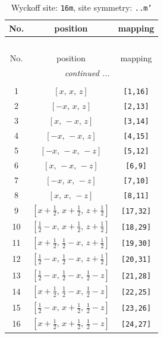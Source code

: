 \documentclass[fleqn,8pt]{jsarticle}
\begin{document}
\renewcommand{\arraystretch}{1.2}
\begin{longtable}{ccc}
\caption{Wyckoff site: {\tt 16m}, site symmetry: {\tt ..m'}}
 \\
 \hline \hline
No. & position & mapping \\ \hline \endfirsthead

\multicolumn{2}{l}{\tablename\ \thetable{}} \\
 \hline \hline
No. & position & mapping \\ \hline \endhead

 \hline \hline
\multicolumn{2}{r}{\footnotesize\it continued ...} \\ \endfoot

 \hline \hline
\multicolumn{2}{r}{} \\ \endlastfoot

1 & $\left[ x,\, x,\, z \right]$ & {\tt [1,16]} \\ \hline
2 & $\left[ - x,\, x,\, z \right]$ & {\tt [2,13]} \\ \hline
3 & $\left[ x,\, - x,\, z \right]$ & {\tt [3,14]} \\ \hline
4 & $\left[ - x,\, - x,\, z \right]$ & {\tt [4,15]} \\ \hline
5 & $\left[ - x,\, - x,\, - z \right]$ & {\tt [5,12]} \\ \hline
6 & $\left[ x,\, - x,\, - z \right]$ & {\tt [6,9]} \\ \hline
7 & $\left[ - x,\, x,\, - z \right]$ & {\tt [7,10]} \\ \hline
8 & $\left[ x,\, x,\, - z \right]$ & {\tt [8,11]} \\ \hline
9 & $\left[ x + \frac{1}{2},\, x + \frac{1}{2},\, z + \frac{1}{2} \right]$ & {\tt [17,32]} \\ \hline
10 & $\left[ \frac{1}{2} - x,\, x + \frac{1}{2},\, z + \frac{1}{2} \right]$ & {\tt [18,29]} \\ \hline
11 & $\left[ x + \frac{1}{2},\, \frac{1}{2} - x,\, z + \frac{1}{2} \right]$ & {\tt [19,30]} \\ \hline
12 & $\left[ \frac{1}{2} - x,\, \frac{1}{2} - x,\, z + \frac{1}{2} \right]$ & {\tt [20,31]} \\ \hline
13 & $\left[ \frac{1}{2} - x,\, \frac{1}{2} - x,\, \frac{1}{2} - z \right]$ & {\tt [21,28]} \\ \hline
14 & $\left[ x + \frac{1}{2},\, \frac{1}{2} - x,\, \frac{1}{2} - z \right]$ & {\tt [22,25]} \\ \hline
15 & $\left[ \frac{1}{2} - x,\, x + \frac{1}{2},\, \frac{1}{2} - z \right]$ & {\tt [23,26]} \\ \hline
16 & $\left[ x + \frac{1}{2},\, x + \frac{1}{2},\, \frac{1}{2} - z \right]$ & {\tt [24,27]} \\
\end{longtable}
\end{document}
